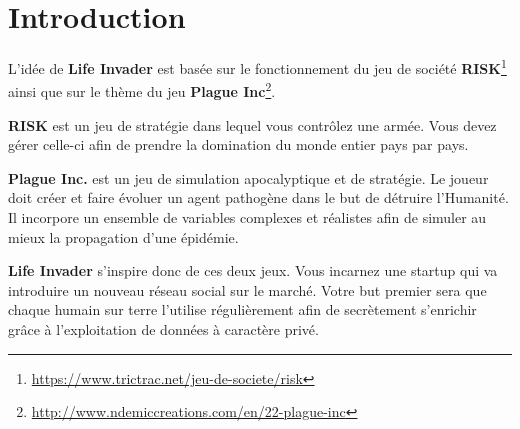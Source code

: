 \chapter*{Introduction}
\label{chap:introduction}

L'idée de \textbf{Life Invader} est basée sur le fonctionnement du jeu de société \textbf{RISK}\footnote{\url{https://www.trictrac.net/jeu-de-societe/risk}} ainsi que sur le thème du jeu \textbf{Plague Inc}\footnote{\url{http://www.ndemiccreations.com/en/22-plague-inc}}.

\textbf{RISK} est un jeu de stratégie dans lequel vous contrôlez une armée. Vous devez gérer celle-ci afin de prendre la domination du monde entier pays par pays.

\textbf{Plague Inc.} est un jeu de simulation apocalyptique et de stratégie. Le joueur doit créer et faire évoluer un agent pathogène dans le but de détruire l'Humanité. 
Il incorpore un ensemble de variables complexes et réalistes afin de simuler au mieux la propagation d'une épidémie.

\textbf{Life Invader} s'inspire donc de ces deux jeux. Vous incarnez une startup qui va introduire un nouveau réseau social sur le marché. Votre but premier sera que chaque humain sur terre l'utilise régulièrement afin de secrètement s'enrichir grâce à l'exploitation de données à caractère privé.

